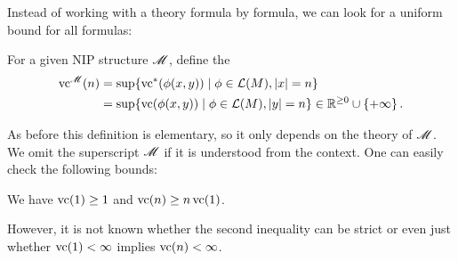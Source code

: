 Instead of working with a theory formula by formula, we can look for a uniform bound for all formulas:
\begin{Definition} \label{vc_fn_def}
  For a given NIP structure $\mathscr M$, define the 
  \begin{align*}
    \operatorname{vc}^\mathscr M(n) &= \sup \{\operatorname{vc}^*(\phi(x, y)) \mid \phi \in \mathcal L(M), |x| = n\} \\
             &= \sup \{\operatorname{vc}(\phi(x, y)) \mid \phi \in \mathcal L(M), |y| = n\} \in \mathbb{R}^{\geq 0} \cup \left\{+\infty\right\}.
  \end{align*}
\end{Definition}

As before this definition is elementary, so it only depends on the theory of $\mathscr M$.
We omit the superscript $\mathscr M$ if it is understood from the context.
One can easily check the following bounds:
\begin{Lemma}  \label{vcone}
  We have $\operatorname{vc}(1) \geq 1$ and $\operatorname{vc}(n) \geq n\operatorname{vc}(1)$.  
\end{Lemma}

However, it is not known whether the second inequality can be strict or even just whether $\operatorname{vc}(1) < \infty$ implies $\operatorname{vc}(n) < \infty$.
